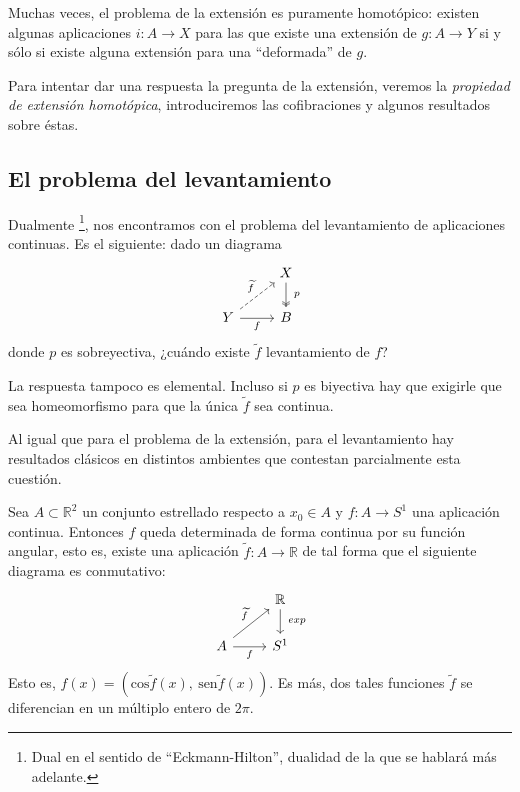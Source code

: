 Muchas veces, el problema de la extensión es puramente homotópico: existen algunas aplicaciones $i : A \longrightarrow X$ para las que existe una extensión de $g : A \longrightarrow Y$ si y sólo si existe alguna extensión para una ``deformada'' de $g$. \par 
Para intentar dar una respuesta la pregunta de la extensión, veremos la \textit{propiedad de extensión homotópica}, introduciremos las cofibraciones y algunos resultados sobre éstas. \par

%


\subsection*{El problema del levantamiento}\label{c1:lev}
Dualmente \footnote{Dual en el sentido de ``Eckmann-Hilton'', dualidad de la que se hablará más adelante.},
nos encontramos con el problema del levantamiento de aplicaciones continuas. Es el siguiente: dado un diagrama
$$
\begin{tikzcd}
	{}	& X \dar[two heads]{\ p} \\
	Y \urar[dashed]{\tilde{f}} \rar[swap]{f} & B
\end{tikzcd}
$$
donde $p$ es sobreyectiva, ¿cuándo existe $\tilde{f}$ levantamiento de $f$?\par 
La respuesta tampoco es elemental. Incluso si $p$ es biyectiva hay que exigirle que sea homeomorfismo para que la única $\tilde{f}$ sea continua.\par

Al igual que para el problema de la extensión, para el levantamiento hay resultados clásicos en distintos ambientes que contestan parcialmente esta cuestión.

\begin{teorf} 
Sea $A \subset \mathbb{R}^2$ un conjunto estrellado respecto a $x_{0} \in A$ y $f : A \longrightarrow S^{1}$ una aplicación continua. Entonces $f$ queda determinada de forma continua por su función angular, esto es, existe una aplicación $\tilde{f} : A \longrightarrow \mathbb{R}$ de tal forma que el siguiente diagrama es conmutativo:
$$
\begin{tikzcd}
	{}	& \mathbb{R} \dar{\ exp} \\
	A \urar{\tilde{f}} \rar[swap]{f} & S^1
\end{tikzcd}
$$
Esto es, $f(x) = \left(\text{cos}\tilde{f}(x), \ \text{sen}\tilde{f}(x) \right)$. Es más, dos tales funciones $\tilde{f}$ se diferencian en un múltiplo entero de $2\pi$.
\end{teorf}

